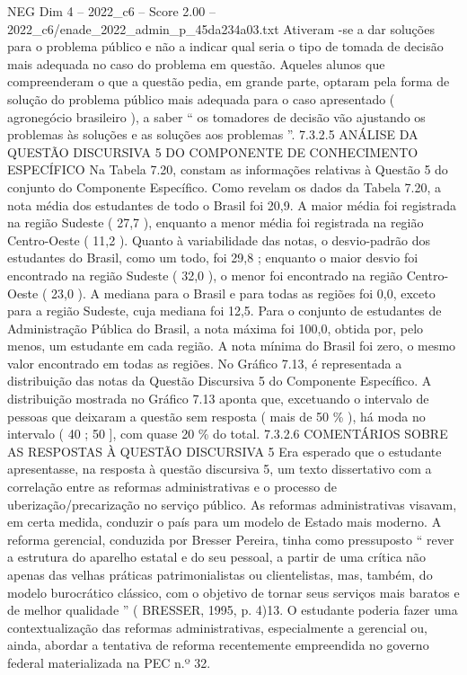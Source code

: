 \begin{textsample}{NEG Dim 4 – 2022\_c6 – Score 2.00 – 2022\_c6/enade\_2022\_admin\_p\_45da234a03.txt}
Ativeram -se a dar soluções para o problema público e não a indicar qual seria o tipo de tomada de decisão mais adequada no caso do problema em questão.
Aqueles alunos que compreenderam o que a questão pedia, em grande parte, optaram pela forma de solução do problema público mais adequada para o caso apresentado ( agronegócio brasileiro ), a saber “ os tomadores de decisão vão ajustando os problemas às soluções e as soluções aos problemas ”. 7.3.2.5 ANÁLISE DA QUESTÃO DISCURSIVA 5 DO COMPONENTE DE CONHECIMENTO ESPECÍFICO Na Tabela 7.20, constam as informações relativas à Questão 5 do conjunto do Componente Específico.
Como revelam os dados da Tabela 7.20, a nota média dos estudantes de todo o Brasil foi 20,9.
A maior média foi registrada na região Sudeste ( 27,7 ), enquanto a menor média foi registrada na região Centro-Oeste ( 11,2 ).
Quanto à variabilidade das notas, o desvio-padrão dos estudantes do Brasil, como um todo, foi 29,8 ; enquanto o maior desvio foi encontrado na região Sudeste ( 32,0 ), o menor foi encontrado na região Centro-Oeste ( 23,0 ).
A mediana para o Brasil e para todas as regiões foi 0,0, exceto para a região Sudeste, cuja mediana foi 12,5.
Para o conjunto de estudantes de Administração Pública do Brasil, a nota máxima foi 100,0, obtida por, pelo menos, um estudante em cada região.
A nota mínima do Brasil foi zero, o mesmo valor encontrado em todas as regiões.
No Gráfico 7.13, é representada a distribuição das notas da Questão Discursiva 5 do Componente Específico.
A distribuição mostrada no Gráfico 7.13 aponta que, excetuando o intervalo de pessoas que deixaram a questão sem resposta ( mais de 50 \% ), há moda no intervalo ( 40 ; 50 ], com quase 20 \% do total. 7.3.2.6 COMENTÁRIOS SOBRE AS RESPOSTAS À QUESTÃO DISCURSIVA 5 Era esperado que o estudante apresentasse, na resposta à questão discursiva 5, um texto dissertativo com a correlação entre as reformas administrativas e o processo de uberização/precarização no serviço público.
As reformas administrativas visavam, em certa medida, conduzir o país para um modelo de Estado mais moderno.
A reforma gerencial, conduzida por Bresser Pereira, tinha como pressuposto “ rever a estrutura do aparelho estatal e do seu pessoal, a partir de uma crítica não apenas das velhas práticas patrimonialistas ou clientelistas, mas, também, do modelo burocrático clássico, com o objetivo de tornar seus serviços mais baratos e de melhor qualidade ” ( BRESSER, 1995, p. 4)13.
O estudante poderia fazer uma contextualização das reformas administrativas, especialmente a gerencial ou, ainda, abordar a tentativa de reforma recentemente empreendida no governo federal materializada na PEC n.º 32.

\end{textsample}
